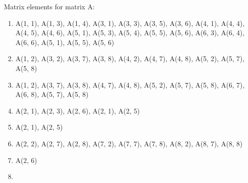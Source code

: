 \documentclass[11pt, fleqn]{article}
\begin{document}
\newpage\noindent
Matrix elements for matrix A:
\begin{enumerate}
	\item {} \begin{minipage}[t]{13cm}
													      A(1, 1), A(1, 3), A(1, 4), A(3, 1), A(3, 3), A(3, 5), A(3, 6), A(4, 1), A(4, 4), A(4, 5), A(4, 6), A(5, 1), A(5, 3), A(5, 4),
														  A(5, 5), A(5, 6), A(6, 3), A(6, 4), A(6, 6), {\color{blue} A(5, 1), A(5, 5), A(5, 6)}
													     \end{minipage}
	\item {} \begin{minipage}[t]{13cm}
														  A(1, 2), A(3, 2), A(3, 7), A(3, 8), A(4, 2), A(4, 7), A(4, 8), A(5, 2), A(5, 7), A(5, 8)
													     \end{minipage}
	\item {} \begin{minipage}[t]{13cm}
														  A(1, 2), A(3, 7), A(3, 8), A(4, 7), A(4, 8), A(5, 2), A(5, 7), A(5, 8), A(6, 7), A(6, 8), {\color{blue} A(5, 7), A(5, 8)}
														 \end{minipage} 
	\item {} \begin{minipage}[t]{13cm}
														 A(2, 1), A(2, 3), A(2, 6), {\color{blue} A(2, 1), A(2, 5)}
														 \end{minipage}
	\item {} \begin{minipage}[t]{13cm}
														  A(2, 1), A(2, 5)
														 \end{minipage} 
	\item {} \begin{minipage}[t]{13cm}
														  A(2, 2), A(2, 7), A(2, 8), A(7, 2), A(7, 7), A(7, 8), A(8, 2), A(8, 7), A(8, 8)
														 \end{minipage} 
	\item {} \begin{minipage}[t]{13cm}
														  A(2, 6)
														 \end{minipage}
	\item {} \begin{minipage}[t]{13cm}

\end{minipage}
\end{enumerate}
\end{document}
